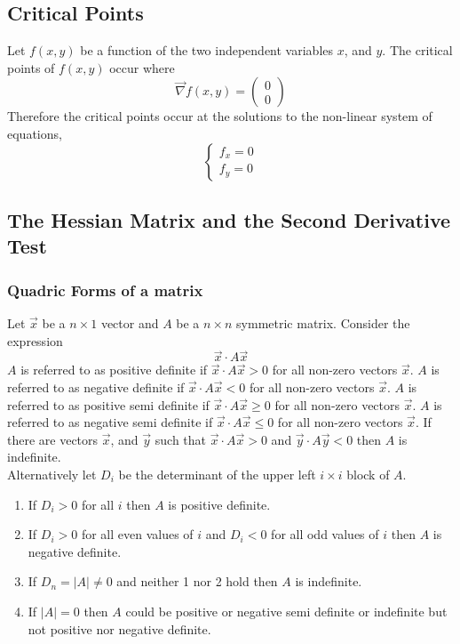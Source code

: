 \documentclass[14pt]{article}
\begin{document}
    \subsection{Critical Points}
    Let $f(x,y)$ be a function of the two independent variables $x$, and $y$. The critical points of $f(x,y)$ occur where
    $$\vec\nabla f(x,y)=\begin{pmatrix}
        0\\0
    \end{pmatrix}$$
    Therefore the critical points occur at the solutions to the non-linear system of equations,
    $$\left\{\begin{array}{lr}
        f_x=0\\
        f_y=0
    \end{array}\right.$$
    \subsection{The Hessian Matrix and the Second Derivative Test}
    \subsubsection{Quadric Forms of a matrix}
    Let $\vec x$ be a $n\times1$ vector and $A$ be a $n\times n$ symmetric matrix. Consider the expression
    $$\vec x \cdot A \vec x$$
    $A$ is referred to as positive definite if $\vec x \cdot A \vec x>0$ for all non-zero vectors $\vec x$. $A$ is referred to as negative definite if $\vec x \cdot A \vec x<0$ for all non-zero vectors $\vec x$.
    $A$ is referred to as positive semi definite if $\vec x \cdot A \vec x\geq0$ for all non-zero vectors $\vec x$. $A$ is referred to as negative semi definite if $\vec x \cdot A \vec x\leq0$ for all non-zero vectors $\vec x$. If there are vectors $\vec x$, and $\vec y$ such that $\vec x \cdot A \vec x>0$ and $\vec y \cdot A \vec y<0$ then $A$ is indefinite.\\
    Alternatively let $D_i$ be the determinant of the upper left $i\times i$ block of $A$.
    \begin{enumerate}
        \item If $D_i>0$ for all $i$ then $A$ is positive definite.
        \item If $D_i>0$ for all even values of $i$ and $D_i<0$ for all odd values of $i$ then $A$ is negative definite.
        \item If $D_n=|A|\neq0$ and neither 1 nor 2 hold then $A$ is indefinite.
        \item If $|A|=0$ then $A$ could be positive or negative semi definite or indefinite but not positive nor negative definite.
    \end{enumerate}
\end{document}
